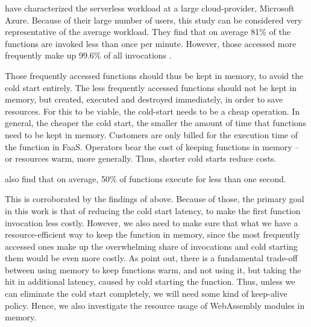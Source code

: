 \citeauthor{Shahrad2020} have characterized the serverless workload at a large cloud-provider, Microsoft Azure. Because of their large number of users, this study can be considered very representative of the average workload.
They find that on average 81\% of the functions are invoked less than once per minute. However, those accessed more frequently make up 99.6\% of all invocations \cite{Shahrad2020}.

Those frequently accessed functions should thus be kept in memory, to avoid the cold start entirely. The less frequently accessed functions should not be kept in memory, but created, executed and destroyed immediately, in order to save resources. For this to be viable, the cold-start needs to be a cheap operation. In general, the cheaper the cold start, the smaller the amount of time that functions need to be kept in memory.
Customers are only billed for the execution time of the function in FaaS. Operators bear the cost of keeping functions in memory -- or resources warm, more generally. Thus, shorter cold starts reduce costs.

\citeauthor{Shahrad2020} also find that on average, 50\% of functions execute for less than one second.

\begin{quote}
\end{quote}

This is corroborated by the findings of \citeauthor{Wang2018} above.
Because of those, the primary goal in this work is that of reducing the cold start latency, to make the first function invocation less costly. However, we also need to make sure that what we have a resource-efficient way to keep the function in memory, since the most frequently accessed ones make up the overwhelming share of invocations and cold starting them would be even more costly.
As \citeauthor{Shahrad2020} point out, there is a fundamental trade-off between using memory to keep functions warm, and not using it, but taking the hit in additional latency, caused by cold starting the function. Thus, unless we can eliminate the cold start completely, we will need some kind of keep-alive policy. Hence, we also investigate the resource usage of WebAssembly modules in memory.

